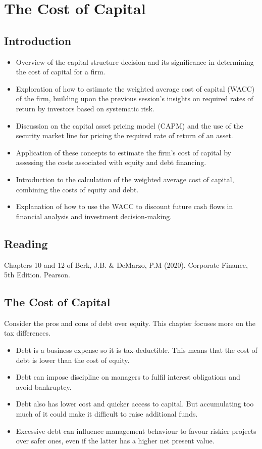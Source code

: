 \chapter{The Cost of Capital}

\section{Introduction}
\begin{itemize}
    \item Overview of the capital structure decision and its significance in determining the cost of capital for a firm.
    \item Exploration of how to estimate the weighted average cost of capital (WACC) of the firm, building upon the previous session's insights on required rates of return by investors based on systematic risk.
    \item Discussion on the capital asset pricing model (CAPM) and the use of the security market line for pricing the required rate of return of an asset.
    \item Application of these concepts to estimate the firm's cost of capital by assessing the costs associated with equity and debt financing.
    \item Introduction to the calculation of the weighted average cost of capital, combining the costs of equity and debt.
    \item Explanation of how to use the WACC to discount future cash flows in financial analysis and investment decision-making.
\end{itemize}

\section{Reading}
Chapters 10 and 12 of Berk, J.B. \& DeMarzo, P.M (2020). Corporate Finance, 5th Edition. Pearson.

\section{The Cost of Capital}

Consider the pros and cons of debt over equity. This chapter focuses more on the tax differences.

\begin{itemize}
    \item Debt is a business expense so it is tax-deductible. This means that the cost of debt is lower than the cost of equity.
    \item Debt can impose discipline on managers to fulfil interest obligations and avoid bankruptcy.
    \item Debt also has lower cost and quicker access to capital. But accumulating too much of it could make it difficult to raise additional funds.
    \item Excessive debt can influence management behaviour to favour riskier projects over safer ones, even if the latter has a higher net present value.
\end{itemize}

